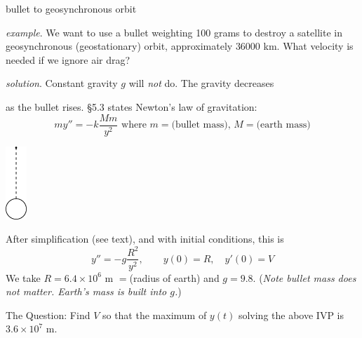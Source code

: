 \documentclass[dvipsnames,colorlinks]{beamer}
\begin{document}
\begin{frame}{bullet to geosynchronous orbit}

\small

\noindent \emph{example}.  We want to use a bullet weighting 100 grams to destroy a satellite in geosynchronous (geostationary) orbit, approximately $36000$ km.  What velocity is needed if we ignore air drag?

\medskip
\noindent \emph{solution}.  Constant gravity $g$ will \emph{not} do.  The gravity decreases

\noindent as the bullet rises.  \S5.3 states Newton's law of gravitation:
    $$m y'' = -k \frac{Mm}{y^2} \text{ where $m=$(bullet mass), $M=$(earth mass)}$$

\vspace{-30mm}

\hfill \includegraphics[width=0.06\textwidth]{figs/earthbullet}

\vspace{5mm}

After simplification (see text), and with initial conditions, this is
    $$y'' = -g \frac{R^2}{y^2}, \qquad y(0)=R, \quad y'(0)=V$$
We take $R=6.4\times 10^6$ m $=$(radius of earth) and $g=9.8$.  (\emph{Note bullet mass does not matter.  Earth's mass is built into $g$.})

\medskip
\alert{The Question: Find $V$ so that the maximum of $y(t)$ solving the above IVP is $3.6\times 10^7$ m.}
\end{frame}
\end{document}
